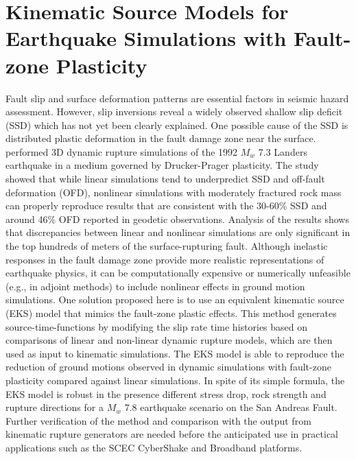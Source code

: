
\linespread{1.7}
\chapter{Kinematic Source Models for Earthquake Simulations with Fault-zone Plasticity}
\linespread{2.0}
\label{chap:eks}

\graphicspath{{/Users/zhh076/work/PhD_way/eks/}}

Fault slip and surface deformation patterns are essential factors in seismic hazard assessment. However, slip inversions reveal a widely observed shallow slip deficit (SSD) which has not yet been clearly explained. One possible cause of the SSD is distributed plastic deformation in the fault damage zone near the surface. \citet{rotenOfffaultDeformationsShallow2017} performed 3D dynamic rupture simulations of the 1992 $M_w$ 7.3 Landers earthquake in a medium governed by Drucker-Prager plasticity. The study showed that while linear simulations tend to underpredict SSD and off-fault deformation (OFD), nonlinear simulations with moderately fractured rock mass can properly reproduce results that are consistent with the 30-60\% SSD and around 46\% OFD reported in geodetic observations. Analysis of the \citet{rotenOfffaultDeformationsShallow2017} results shows that discrepancies between linear and nonlinear simulations are only significant in the top hundreds of meters of the surface-rupturing fault. Although inelastic responses in the fault damage zone provide more realistic representations of earthquake physics, it can be computationally expensive or numerically unfeasible (e.g., in adjoint methods) to include nonlinear effects in ground motion simulations. One solution proposed here is to use an equivalent kinematic source (EKS) model that mimics the fault-zone plastic effects. This method generates source-time-functions by modifying the slip rate time histories based on comparisons of linear and non-linear dynamic rupture models, which are then used as input to kinematic simulations. The EKS model is able to reproduce the reduction of ground motions observed in dynamic simulations with fault-zone plasticity compared against linear simulations. In spite of its simple formula, the EKS model is robust in the presence different stress drop, rock strength and rupture directions for a $M_w$ 7.8 earthquake scenario on the San Andreas Fault. Further verification of the method and comparison with the output from kinematic rupture generators are needed before the anticipated use in practical applications such as the SCEC CyberShake and Broadband platforms.


